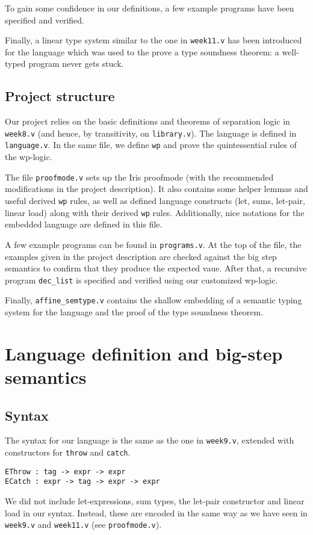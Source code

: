 \documentclass{article}
\begin{document}
To gain some confidence in our definitions, a few example programs have been specified and verified.

Finally, a linear type system similar to the one in \texttt{week11.v} has been introduced for the language which was used to the
prove a type soundness theorem: a well-typed program never gets stuck.

\subsection{Project structure}

Our project relies on the basic definitions and theorems of separation logic in \texttt{week8.v} (and hence, by transitivity, on \texttt{library.v}).
The language is defined in \texttt{language.v}. In the same file, we define \texttt{wp} and prove the quintessential rules of the wp-logic.

The file \texttt{proofmode.v} sets up the Iris proofmode (with the recommended modifications in the project description). It also contains some
helper lemmas and useful derived \texttt{wp} rules, as well as defined language constructs (let, sums, let-pair, linear load)
along with their derived \texttt{wp} rules. Additionally, nice notations for the embedded language are defined in this file.

A few example programs can be found in \texttt{programs.v}.  At the top of the file, the examples given in the project description
are checked against the big step semantics to confirm that they produce the expected vaue. After that, a recursive program \texttt{dec\_list} is
specified and verified using our customized wp-logic.

Finally, \texttt{affine\_semtype.v} contains the shallow embedding of a semantic typing system for the language and the proof of the type soundness theorem.

\section{Language definition and big-step semantics}

\subsection{Syntax}

The syntax for our language is the same as the one in \texttt{week9.v}, extended with constructors for \texttt{throw} and \texttt{catch}.
\begin{lstlisting}
EThrow : tag -> expr -> expr
ECatch : expr -> tag -> expr -> expr
\end{lstlisting}
We did not include let-expressions, sum types, the let-pair constructor and linear load in our syntax. Instead, these are encoded in the same way as we have
seen in \texttt{week9.v} and \texttt{week11.v} (see \texttt{proofmode.v}).
\end{document}
